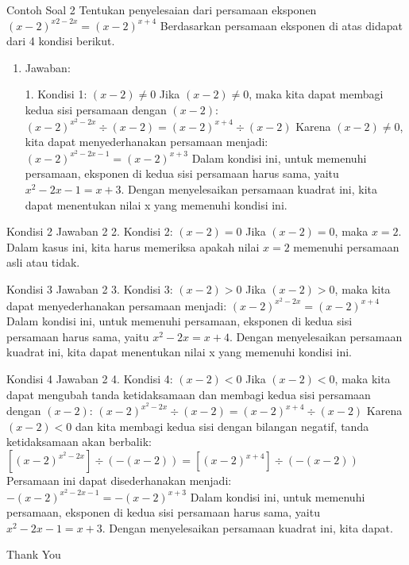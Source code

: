 \documentclass{beamer}
\begin{document}
\begin{frame}{Contoh Soal 2}
Tentukan penyelesaian dari persamaan eksponen $(x-2)^{x2-2x} = (x-2)^{x+4}$ Berdasarkan persamaan eksponen di atas didapat dari 4 kondisi berikut.

\begin{enumerate}
    \item[]
\begin{tex}
    Jawaban:
\end{tex}
1. Kondisi 1: $(x-2) \neq 0$
   Jika $(x-2) \neq 0$, maka kita dapat membagi kedua sisi persamaan dengan $(x-2)$:
   $(x-2)^{x^2-2x} \div (x-2) = (x-2)^{x+4} \div (x-2)$
   Karena $(x-2) \neq 0$, kita dapat menyederhanakan persamaan menjadi:
   $(x-2)^{x^2-2x-1} = (x-2)^{x+3}$
   Dalam kondisi ini, untuk memenuhi persamaan, eksponen di kedua sisi persamaan harus sama, yaitu $x^2-2x-1 = x+3$. Dengan menyelesaikan persamaan kuadrat ini, kita dapat menentukan nilai x yang memenuhi kondisi ini.
\end{enumerate}
\end{frame}

\begin{frame}{Kondisi 2 Jawaban 2}
2. Kondisi 2: $(x-2) = 0$
   Jika $(x-2) = 0$, maka $x = 2$. Dalam kasus ini, kita harus memeriksa apakah nilai $x = 2$ memenuhi persamaan asli atau tidak.
\end{frame}
\begin{frame}{Kondisi 3 Jawaban 2}
3. Kondisi 3: $(x-2) > 0$
   Jika $(x-2) > 0$, maka kita dapat menyederhanakan persamaan menjadi:
   $(x-2)^{x^2-2x} = (x-2)^{x+4}$
   Dalam kondisi ini, untuk memenuhi persamaan, eksponen di kedua sisi persamaan harus sama, yaitu $x^2-2x = x+4$. Dengan menyelesaikan persamaan kuadrat ini, kita dapat menentukan nilai x yang memenuhi kondisi ini.
\end{frame}
\begin{frame}{Kondisi 4 Jawaban 2}
4. Kondisi 4: $(x-2) < 0$
   Jika $(x-2) < 0$, maka kita dapat mengubah tanda ketidaksamaan dan membagi kedua sisi persamaan dengan $(x-2)$:
   $(x-2)^{x^2-2x} \div (x-2) = (x-2)^{x+4} \div (x-2)$
   Karena $(x-2) < 0$ dan kita membagi kedua sisi dengan bilangan negatif, tanda ketidaksamaan akan berbalik:
   $[(x-2)^{x^2-2x}] \div (-(x-2)) = [(x-2)^{x+4}] \div (-(x-2))$
   Persamaan ini dapat disederhanakan menjadi:
   $-(x-2)^{x^2-2x-1} = -(x-2)^{x+3}$
   Dalam kondisi ini, untuk memenuhi persamaan, eksponen di kedua sisi persamaan harus sama, yaitu $x^2-2x-1 = x+3$. Dengan menyelesaikan persamaan kuadrat ini, kita dapat.

\end{frame}
\begin{frame}
    \begin{center}
        Thank You
    \end{center}
\end{frame}
\end{document}
